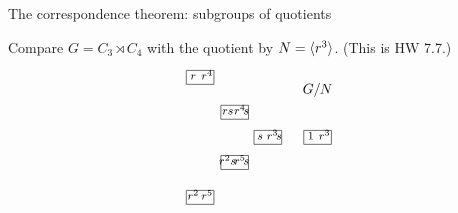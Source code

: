 \documentclass[8pt, handout]{beamer}
\begin{document}
\begin{frame}{The correspondence theorem: subgroups of quotients}
  
  Compare $G=C_3 \rtimes C_4$ with the quotient by $N=\langle r^3\rangle$. (This is HW 7.7.)
  \[
  \begin{tikzpicture}[scale=.7,baseline=1.3ex,auto]
    \tikzstyle{every node}=[font=\footnotesize]
    \node at (2.5,1.95) {\normalsize $G/N$};
    \begin{scope}[shift={(.2,0)},scale=1]
      \draw (0,0) rectangle (1,.5);
      \node[anchor=south] at (.22,0) {$s$};
      \draw[anchor=south] (.73,0) node{$r^3\!s$};
      \node (123-b) at (1,.25) {};
      \node (123-out) at (.55,0) {}; \node (123-in) at (.55,.5) {};
    \end{scope}
    \begin{scope}[shift={(-1,-.9)}]  %
      \draw (0,0) rectangle (1,.5);
      \node[anchor=south] at (.24,0) {$r^2s$};
      \draw[anchor=south] (.75,0) node{$r^5\!s$};
      \node (231-b) at (.2,0) {};
      \node (231-in) at (1,.25) {}; \node (231-out) at (0,.5) {};
    \end{scope}
    \begin{scope}[shift={(-1,.9)}]
      \draw (0,0) rectangle (1,.5);
      \node[anchor=south] at (.25,0) {$rs$};
      \draw[anchor=south] (.75,0) node{$r^4\!s$};
      \node (312-b) at (.2,.5) {};
      \node (312-in) at (0,0) {}; \node (312-out) at (1,.25) {};
    \end{scope}
    \begin{scope}[shift={(2,0)}]
      \draw (0,0) rectangle (1,.5);
      \node[anchor=south] at (.25,0) {$1$};
      \draw[anchor=south] (.75,0) node{$r^3$};
      \node (132-b) at (0,.25) {};
      \node (132-in) at (0,0) {}; \node (132-out) at (0,.5) {};
    \end{scope}
    \begin{scope}[shift={(-2.25,-2.15)}]
      \draw (0,0) rectangle (1,.5);
      \node[anchor=south] at (.25,0) {$r^2$};
      \draw[anchor=south] (.75,0) node{$r^5$};
      \node (213-b) at (.8,.5) {};
      \node (213-in) at (.3,.5) {}; \node (213-out) at (1,.25) {};
    \end{scope}
    \begin{scope}[shift={(-2.25,2.15)}]
      \draw (0,0) rectangle (1,.5);
      \node[anchor=south] at (.25,0) {$r$};
      \draw[anchor=south] (.75,0) node{$r^4$};
      \node (321-b) at (.8,0) {};
      \node (321-in) at (1,.25) {}; \node (321-out) at (.3,0) {};

\end{scope}
\end{tikzpicture}\]
\end{frame}
\end{document}

